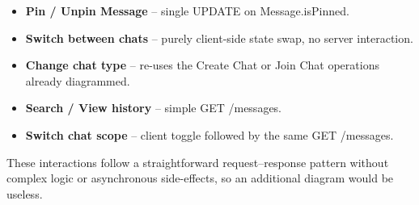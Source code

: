 \documentclass[]{VUMIFTemplateClass}
\begin{document}
\begin{itemize}
  \item \textbf{Pin / Unpin Message} – single UPDATE on
        Message.isPinned.
  \item \textbf{Switch between chats} – purely client-side state swap,
        no server interaction.
  \item \textbf{Change chat type} – re-uses the Create Chat
        or Join Chat operations already diagrammed.
  \item \textbf{Search / View history} – simple 
        GET /messages.
  \item \textbf{Switch chat scope} – client toggle followed by
        the same GET /messages.
\end{itemize}

These interactions follow a straightforward request–response pattern
without complex logic or asynchronous side-effects, so an additional
diagram would be useless.
\end{document}
